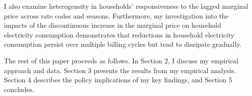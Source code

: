 I also examine heterogeneity in households' responsiveness to the lagged marginal price across rate codes and seasons. Furthermore, my investigation into the impacts of the discontinuous increase in the marginal price on household electricity consumption demonstrates that reductions in household electricity consumption persist over multiple billing cycles but tend to dissipate gradually. 

The rest of this paper proceeds as follows. In Section 2, I discuss my empirical approach and data. Section 3 presents the results from my empirical analysis. Section 4 describes the policy implications of my key findings, and Section 5 concludes. 
